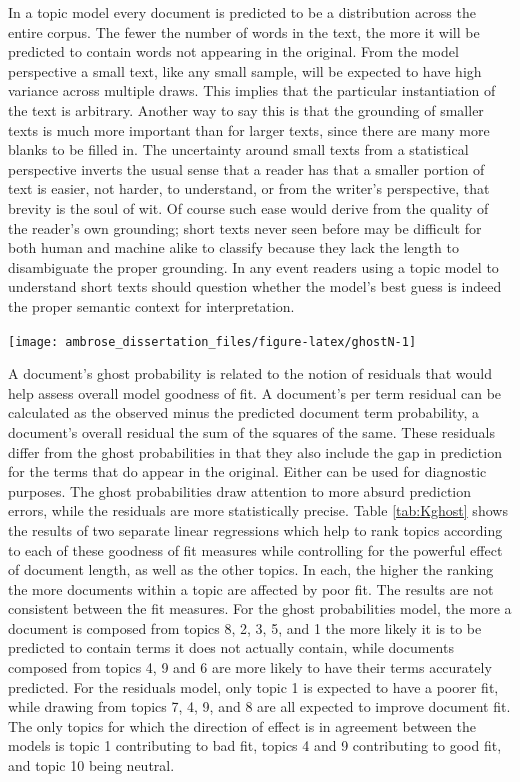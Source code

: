\documentclass[]{book}
\theoremstyle{definition}
\theoremstyle{definition}
\theoremstyle{definition}
\theoremstyle{remark}
\begin{document}
In a topic model every document is predicted to be a distribution across
the entire corpus. The fewer the number of words in the text, the more
it will be predicted to contain words not appearing in the original.
From the model perspective a small text, like any small sample, will be
expected to have high variance across multiple draws. This implies that
the particular instantiation of the text is arbitrary. Another way to
say this is that the grounding of smaller texts is much more important
than for larger texts, since there are many more blanks to be filled in.
The uncertainty around small texts from a statistical perspective
inverts the usual sense that a reader has that a smaller portion of text
is easier, not harder, to understand, or from the writer's perspective,
that brevity is the soul of wit. Of course such ease would derive from
the quality of the reader's own grounding; short texts never seen before
may be difficult for both human and machine alike to classify because
they lack the length to disambiguate the proper grounding. In any event
readers using a topic model to understand short texts should question
whether the model's best guess is indeed the proper semantic context for
interpretation.

\begin{center}\texttt{[image: ambrose\_dissertation\_files/figure-latex/ghostN-1]} \end{center}

A document's ghost probability is related to the notion of residuals
that would help assess overall model goodness of fit. A document's per
term residual can be calculated as the observed minus the predicted
document term probability, a document's overall residual the sum of the
squares of the same. These residuals differ from the ghost probabilities
in that they also include the gap in prediction for the terms that do
appear in the original. Either can be used for diagnostic purposes. The
ghost probabilities draw attention to more absurd prediction errors,
while the residuals are more statistically precise. Table
\ref{tab:Kghost} shows the results of two separate linear regressions
which help to rank topics according to each of these goodness of fit
measures while controlling for the powerful effect of document length,
as well as the other topics. In each, the higher the ranking the more
documents within a topic are affected by poor fit. The results are not
consistent between the fit measures. For the ghost probabilities model,
the more a document is composed from topics 8, 2, 3, 5, and 1 the more
likely it is to be predicted to contain terms it does not actually
contain, while documents composed from topics 4, 9 and 6 are more likely
to have their terms accurately predicted. For the residuals model, only
topic 1 is expected to have a poorer fit, while drawing from topics 7,
4, 9, and 8 are all expected to improve document fit. The only topics
for which the direction of effect is in agreement between the models is
topic 1 contributing to bad fit, topics 4 and 9 contributing to good
fit, and topic 10 being neutral.
\end{document}
